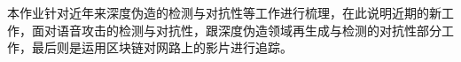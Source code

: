 \begin{cabstract}

本作业针对近年来深度伪造的检测与对抗性等工作进行梳理，在此说明近期的新工作，面对语音攻击的检测与对抗性，跟深度伪造领域再生成与检测的对抗性部分工作，最后则是运用区块链对网路上的影片进行追踪。

\end{cabstract}


